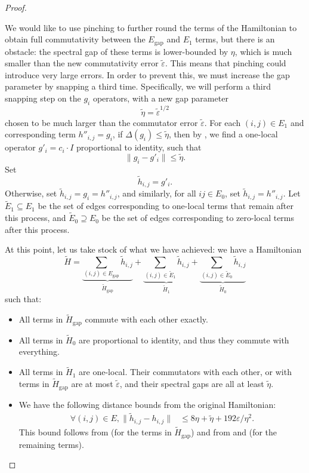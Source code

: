 \documentclass[11pt]{article}
\newcommand{\gap}{\mathrm{gap}}
\theoremstyle{plain}
\newcommand{\eps}{\varepsilon}
\begin{document}
\begin{proof}
\begin{enumerate}
    We would like to use pinching to further round the terms of the Hamiltonian to obtain full commutativity between the $E_{\gap}$ and $E_1$ terms, but there is an obstacle: the spectral gap of these terms is lower-bounded by $\eta$, which is much smaller than the new commutativity error $\tilde{\eps}$. This means that pinching could introduce very large errors. In order to prevent this, we must increase the gap parameter by snapping a third time. Specifically, we will perform a third snapping step on the $g_i$ operators, with a new gap parameter
    \[ \tilde{\eta} = \tilde{\eps}^{1/2} \]
    chosen to be much larger than the commutator error $\tilde{\eps}$. For each $(i,j) \in E_1$ and corresponding term $h''_{i,j} = g_i$, if $\Delta(g_i) \leq \tilde{\eta}$, then by , we find a one-local operator $g'_i = c_i \cdot I$ proportional to identity, such that
    \begin{equation} \| g_i - g'_i \| \leq \tilde{\eta}. \label{eq:g-to-gprime} \end{equation}
    Set
    \[ \tilde{h}_{i,j} = g'_i.\]
    Otherwise, set $\tilde{h}_{i,j} = g_i = h''_{i,j}$, and similarly, for all $ij \in E_0$, set $\tilde{h}_{i,j} = h''_{i,j}$. Let $\tilde{E}_1 \subseteq E_1$ be the set of edges corresponding to one-local terms that remain after this process, and $\tilde{E}_0 \supseteq E_0$ be the set of edges corresponding to zero-local terms after this process.

    At this point, let us take stock of what we have achieved: we have a Hamiltonian 
    \[ \tilde{H} = \underbrace{\sum_{(i,j) \in E_{\gap}} \tilde{h}_{i,j}}_{\tilde{H}_\gap} + \underbrace{\sum_{(i,j) \in \tilde{E}_{1}} \tilde{h}_{i,j}}_{\tilde{H}_1} + \underbrace{\sum_{(i,j) \in \tilde{E}_{0}} \tilde{h}_{i,j}}_{\tilde{H}_0}\] such that:
    \begin{itemize}
        \item All terms in $\tilde{H}_{\gap}$ commute with each other exactly.
        \item All terms in $\tilde{H}_0$ are proportional to identity, and thus they commute with everything.
        \item All terms in $\tilde{H}_1$ are one-local. Their commutators with each other, or with terms in $\tilde{H}_{\gap}$ are at most $\tilde{\eps}$, and their spectral gaps are all at least $\tilde{\eta}$. 
        \item We have the following distance bounds from the original Hamiltonian:
        \begin{align}
            \forall (i,j)\in E, \|\tilde{h}_{i,j} - h_{i,j} \| &\leq 8\eta + \tilde{\eta} + 192\eps/\eta^2. \label{eq:htilde-to-h-distance}
        \end{align}
        This bound follows from  (for the terms in $\tilde{H}_{\gap}$) and from   and  (for the remaining terms).
    \end{itemize}


\end{enumerate}
\end{proof}
\end{document}
